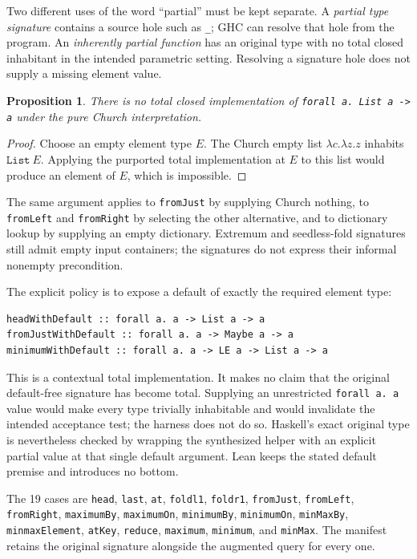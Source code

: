\documentclass[11pt]{article}
\newcommand{\code}[1]{\texttt{#1}}
\newtheorem{proposition}{Proposition}
\begin{document}
Two different uses of the word ``partial'' must be kept separate. A
\emph{partial type signature} contains a source hole such as \code{\_}; GHC
can resolve that hole from the program. An \emph{inherently partial function}
has an original type with no total closed inhabitant in the intended
parametric setting. Resolving a signature hole does not supply a missing
element value.

\begin{proposition}
There is no total closed implementation of
\code{forall a. List a -> a} under the pure Church interpretation.
\end{proposition}
\begin{proof}
Choose an empty element type $E$. The Church empty list
$\lambda c.\lambda z.z$ inhabits $\code{List}\ E$. Applying the purported
total implementation at $E$ to this list would produce an element of $E$,
which is impossible.
\end{proof}

The same argument applies to \code{fromJust} by supplying Church nothing, to
\code{fromLeft} and \code{fromRight} by selecting the other alternative, and
to dictionary lookup by supplying an empty dictionary. Extremum and
seedless-fold signatures still admit empty input containers; the signatures
do not express their informal nonempty precondition.

The explicit policy is to expose a default of exactly the required element
type:
\begin{lstlisting}
headWithDefault :: forall a. a -> List a -> a
fromJustWithDefault :: forall a. a -> Maybe a -> a
minimumWithDefault :: forall a. a -> LE a -> List a -> a
\end{lstlisting}
This is a contextual total implementation. It makes no claim that the original
default-free signature has become total. Supplying an unrestricted
\code{forall a. a} value would make every type trivially inhabitable and
would invalidate the intended acceptance test; the harness does not do so.
Haskell's exact original type is nevertheless checked by wrapping the
synthesized helper with an explicit partial value at that single default
argument. Lean keeps the stated default premise and introduces no bottom.

The 19 cases are \code{head}, \code{last}, \code{at}, \code{foldl1},
\code{foldr1}, \code{fromJust}, \code{fromLeft}, \code{fromRight},
\code{maximumBy}, \code{maximumOn}, \code{minimumBy}, \code{minimumOn},
\code{minMaxBy}, \code{minmaxElement}, \code{atKey}, \code{reduce},
\code{maximum}, \code{minimum}, and \code{minMax}. The manifest retains the
original signature alongside the augmented query for every one.
\end{document}
